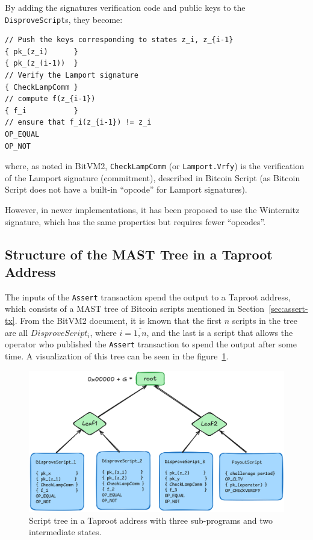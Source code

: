 \documentclass[11pt]{article}
\begin{document}
By adding the signatures verification code and public keys to the
\texttt{DisproveScript}s, they become:

\begin{verbatim}
// Push the keys corresponding to states z_i, z_{i-1}
{ pk_(z_i)      }
{ pk_(z_(i-1))  }
// Verify the Lamport signature
{ CheckLampComm }
// compute f(z_{i-1})
{ f_i           }
// ensure that f_i(z_{i-1}) != z_i
OP_EQUAL
OP_NOT
\end{verbatim}

where, as noted in BitVM2, \texttt{CheckLampComm} (or
\texttt{Lamport.Vrfy}) is the verification of the Lamport signature
(commitment), described in Bitcoin Script (as Bitcoin Script does not
have a built-in ``opcode'' for Lamport signatures).

However, in newer implementations, it has been proposed to use the
Winternitz signature, which has the same properties but requires fewer
``opcodes''.

\subsection{Structure of the MAST Tree in a Taproot
Address}\label{sec:mast-tree-structure}

The inputs of the \texttt{Assert} transaction spend the output to a
Taproot address, which consists of a MAST tree of Bitcoin scripts
mentioned in Section~\ref{sec:assert-tx}. From the BitVM2 document, it
is known that the first \(n\) scripts in the tree are all
\(DisproveScript_i\), where \(i = \overline{1, n}\), and the last is a
script that allows the operator who published the \texttt{Assert}
transaction to spend the output after some time. A visualization of
this tree can be seen in the figure~\ref{fig:assert-tx-mast-tree}.

\begin{figure}[htbp]
  \centering
  \includegraphics[width=.9\linewidth]{../images/assert-tx-taproot-output.png}
  \caption{\label{fig:assert-tx-mast-tree}Script tree in a Taproot
  address with three sub-programs and two intermediate states.}
\end{figure}
\end{document}
